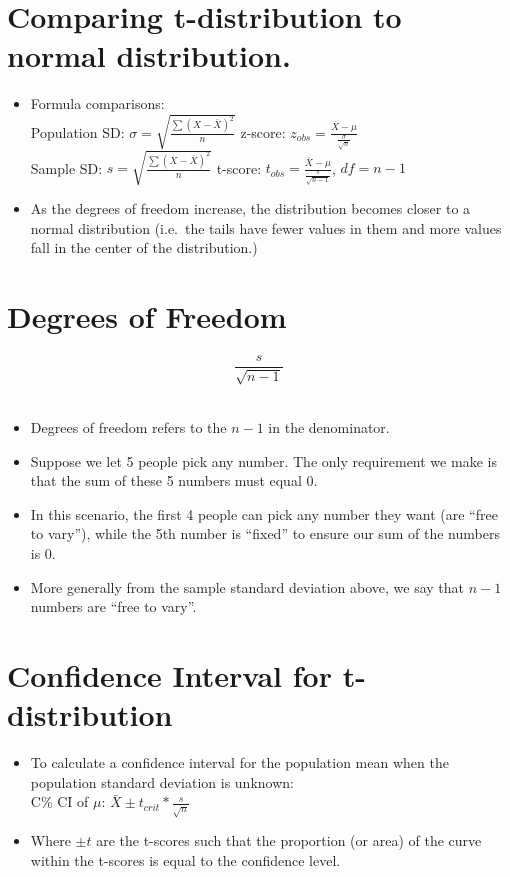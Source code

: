 \documentclass[12pt]{article}
\begin{document}
\section{Comparing t-distribution to normal
distribution.}\label{comparing-t-distribution-to-normal-distribution.-1}

\begin{itemize}
\item
  Formula comparisons:\\Population SD:
  \(\sigma = \sqrt{\frac{\sum(X - \bar{X})^2}{n}}\) z-score:
  \(z_{obs} = \frac{\bar{X} - \mu}{\frac{\sigma}{\sqrt{n}}}\)\\Sample
  SD: \(s = \sqrt{\frac{\sum(X - \bar{X})^2}{n}}\) t-score:
  \(t_{obs} = \frac{\bar{X} - \mu}{\frac{s}{\sqrt{n-1}}}\), \(df = n - 1\)
\item
  As the degrees of freedom increase, the distribution becomes closer to
  a normal distribution (i.e.~the tails have fewer values in them and
  more values fall in the center of the distribution.)
\end{itemize}

\section{Degrees of Freedom}\label{degrees-of-freedom}

\[ \frac{s}{\sqrt{n-1}} \]\\
\begin{itemize}
\item Degrees of freedom refers to the \(n-1\) in the denominator. 
\item Suppose we let 5 people pick any number. The only requirement we make is that the sum of these 5
numbers must equal 0. 
\item In this scenario, the first 4 people can pick
any number they want (are ``free to vary''), while the 5th number is
``fixed'' to ensure our sum of the numbers is 0. 
\item More generally from
the sample standard deviation above, we say that \(n-1\) numbers are
``free to vary''.
\end{itemize}

\section{Confidence Interval for
t-distribution}\label{confidence-interval-for-t-distribution}

\begin{itemize}
\itemsep1pt\parskip0pt
\item
  To calculate a confidence interval for the population mean when the
  population standard deviation is unknown:\\C\% CI of \(\mu\):
  \(\bar{X} \pm t_{crit} * \frac{s}{\sqrt{n}}\)\\
\item
  Where \(\pm t\) are the t-scores such that the proportion (or area) of
  the curve within the t-scores is equal to the confidence level.
\end{itemize}
\end{document}
